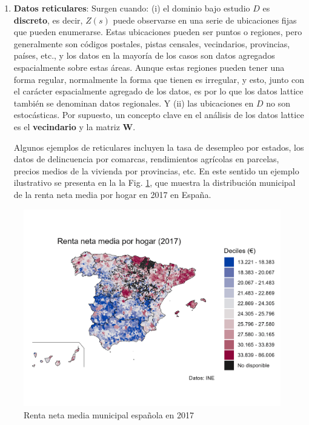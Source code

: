 \documentclass[
]{book}
\theoremstyle{definition}
\theoremstyle{definition}
\theoremstyle{definition}
\theoremstyle{definition}
\theoremstyle{remark}
\begin{document}
\begin{enumerate}
\def\labelenumi{\arabic{enumi}.}
\setcounter{enumi}{1}
\item
  \textbf{Datos reticulares}: Surgen cuando: (i) el dominio bajo estudio \(D\) es
  \textbf{discreto}, es decir, \(Z(s)\) puede observarse en una serie de ubicaciones
  fijas que pueden enumerarse. Estas ubicaciones pueden ser puntos o regiones,
  pero generalmente son códigos postales, pistas censales, vecindarios,
  provincias, países, etc., y los datos en la mayoría de los casos son datos
  agregados espacialmente sobre estas áreas. Aunque estas regiones pueden
  tener una forma regular, normalmente la forma que tienen es irregular, y
  esto, junto con el carácter espacialmente agregado de los datos, es por lo
  que los datos lattice también se denominan datos regionales. Y (ii) las
  ubicaciones en \(D\) no son estocásticas. Por supuesto, un concepto clave en
  el análisis de los datos lattice es el \textbf{vecindario} y la matriz \textbf{W}.

  Algunos ejemplos de reticulares incluyen la tasa de desempleo por estados,
  los datos de delincuencia por comarcas, rendimientos agrícolas en parcelas,
  precios medios de la vivienda por provincias, etc. En este sentido un
  ejemplo ilustrativo se presenta en la la Fig. \ref{fig:ejem-lattice}, que
  muestra la distribución municipal de la renta neta media por hogar en 2017
  en España.
\end{enumerate}

\begin{figure}

{\centering \includegraphics[width=0.6\linewidth]{img/renta2017} 

}

\caption{Renta neta media municipal española en 2017}\label{fig:ejem-lattice}
\end{figure}
\end{document}
